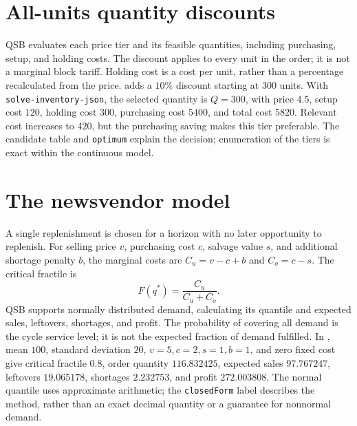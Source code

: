 \section{All-units quantity discounts}
QSB evaluates each price tier and its feasible quantities, including purchasing,
setup, and holding costs. The discount applies to every unit in the order; it
is not a marginal block tariff. Holding cost is a cost per unit, rather than a
percentage recalculated from the price.
 adds a \(10\%\) discount starting at \(300\)
units. With \texttt{solve-inventory-json}, the selected quantity is
\(Q=300\), with price \(4.5\), setup cost \(120\), holding cost \(300\),
purchasing cost \(5400\), and total cost \(5820\). Relevant cost increases
to \(420\), but the purchasing saving makes this tier preferable. The
candidate table and \texttt{optimum} explain the decision; enumeration of the
tiers is exact within the continuous model.

\section{The newsvendor model}
A single replenishment is chosen for a horizon with no later opportunity to
replenish. For selling price \(v\), purchasing cost \(c\), salvage value
\(s\), and additional shortage penalty \(b\), the marginal costs are
\(C_u=v-c+b\) and \(C_o=c-s\). The critical fractile is
\[
 F(q^*)=\frac{C_u}{C_u+C_o}.
\]
QSB supports normally distributed demand, calculating its quantile and expected
sales, leftovers, shortages, and profit. The probability of covering all demand
is the cycle service level; it is not the expected fraction of demand fulfilled.
In , mean \(100\), standard deviation \(20\),
\(v=5,c=2,s=1,b=1\), and zero fixed cost give critical fractile \(0.8\),
order quantity \(116.832425\), expected sales \(97.767247\), leftovers
\(19.065178\), shortages \(2.232753\), and profit \(272.003808\).
The normal quantile uses approximate arithmetic; the \texttt{closedForm}
label describes the method, rather than an exact decimal quantity or a guarantee
for nonnormal demand.

